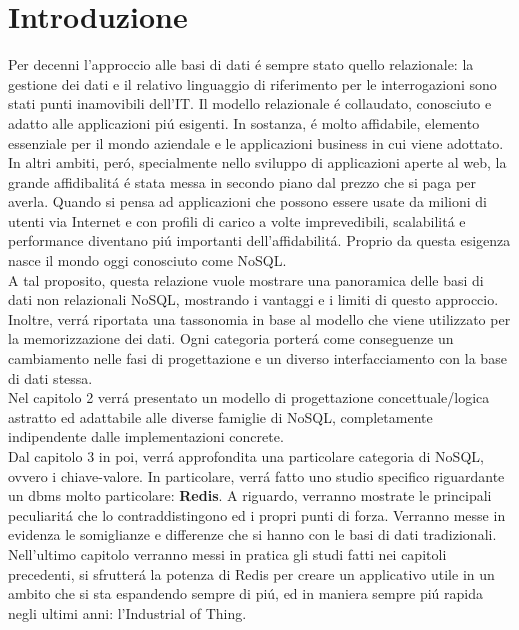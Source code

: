 \chapter*{Introduzione}
Per decenni l'approccio alle basi di dati é sempre stato quello relazionale: la gestione dei dati e il relativo
linguaggio di riferimento per le interrogazioni sono stati punti inamovibili dell'IT.
Il modello relazionale é collaudato, conosciuto e adatto alle applicazioni piú esigenti. In sostanza, é molto
affidabile, elemento essenziale per il mondo aziendale e le applicazioni business in cui viene adottato.\\
In altri ambiti, peró, specialmente nello sviluppo di applicazioni aperte al web, la grande affidibalitá é stata
messa in secondo piano dal prezzo che si paga per averla. Quando si pensa ad applicazioni che possono essere
usate da milioni di utenti via Internet e con profili di carico a volte imprevedibili, scalabilitá e performance
diventano piú importanti dell'affidabilitá. Proprio da questa esigenza nasce il mondo oggi conosciuto come NoSQL.\\
A tal proposito, questa relazione vuole mostrare una panoramica delle basi di dati non relazionali NoSQL,
mostrando i vantaggi e i limiti di questo approccio. Inoltre, verrá riportata
una tassonomia in base al modello che viene utilizzato per la memorizzazione dei dati.
Ogni categoria porterá come conseguenze un cambiamento nelle fasi di progettazione e un diverso interfacciamento
con la base di dati stessa.\\
Nel capitolo 2 verrá presentato un modello di progettazione concettuale/logica
astratto ed adattabile alle diverse famiglie di NoSQL, completamente indipendente dalle implementazioni concrete.\\
Dal capitolo 3 in poi, verrá approfondita una particolare categoria di NoSQL, ovvero i chiave-valore. In particolare,
verrá fatto uno studio specifico riguardante un dbms molto particolare: \textbf{Redis}.
A riguardo, verranno mostrate le principali peculiaritá che lo contraddistingono ed i propri punti di forza.
Verranno messe in evidenza le somiglianze e differenze che si hanno con le basi di dati tradizionali.\\
Nell'ultimo capitolo verranno messi in pratica gli studi fatti nei capitoli precedenti, si sfrutterá
la potenza di Redis per creare un applicativo utile in un ambito che si sta espandendo sempre di piú, ed in maniera sempre piú rapida
negli ultimi anni: l'Industrial of Thing.
